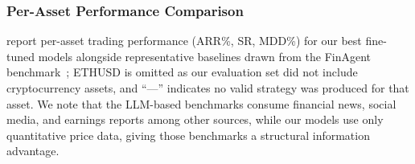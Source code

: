 \documentclass[conference,a4paper]{IEEEtran}
\begin{document}
\begin{table}[t]
  \centering
  \caption{Strategy generation performance of fine-tuned vs.\ base models.}
  \label{tab:model-comparison}
\end{table}

\subsubsection{Per-Asset Performance Comparison}
 report per-asset trading performance
(ARR\%, SR, MDD\%) for our best fine-tuned models alongside representative baselines drawn
from the FinAgent benchmark~\cite{zhang2024finagent}; ETHUSD is omitted as our evaluation
set did not include cryptocurrency assets, and ``---'' indicates no valid strategy was
produced for that asset. We note that the LLM-based benchmarks consume financial news,
social media, and earnings reports among other sources, while our models use only
quantitative price data, giving those benchmarks a structural information advantage.
\end{document}
